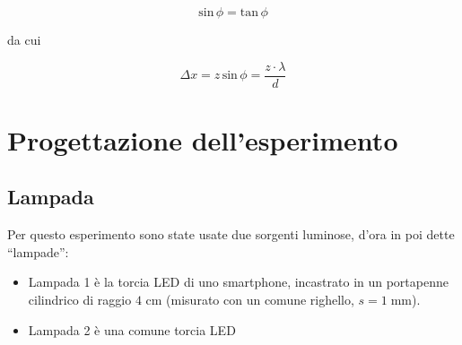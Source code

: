 \documentclass{article}
\begin{document}
\[\textrm{sin} \, \phi =\textrm{tan} \, \phi\]

da cui 

\begin{equation}
\Delta x = z\, \textrm{sin} \, \phi = \frac{z \cdot \lambda}{d}
\end{equation}

\section{Progettazione dell'esperimento}

\subsection{Lampada}

Per questo esperimento sono state usate due sorgenti luminose, d'ora in poi dette ``lampade'':

\begin{itemize}
  \item Lampada 1 è la torcia LED di uno smartphone, incastrato in un portapenne cilindrico di raggio $4$ cm (misurato con un comune righello, $s = 1 \; \textrm{mm}$).
  \item Lampada 2 è una comune torcia LED
\end{itemize}
\end{document}
